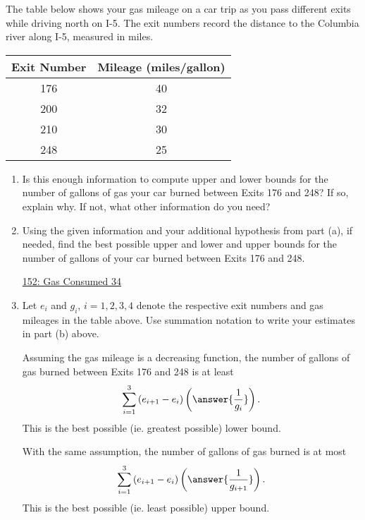 \documentclass{ximera}
\begin{document}
\begin{exercise}  \label{ExY6r3erMMdvb}

The table below shows your gas mileage on a car trip as you pass different exits while driving north on I-5. The exit numbers record the distance to the Columbia river along I-5, measured in miles.


\begin{tabular}{|c|c|}
\hline
Exit Number & Mileage (miles/gallon) \\
\hline
176 & 40 \\  \hline
200 & 32 \\ \hline
210 & 30 \\ \hline
248 & 25 \\
\hline
\end{tabular}

\begin{enumerate}

\item Is this enough information to compute upper and lower bounds for the number of gallons of gas your car burned between Exits 176 and 248? If so, explain why. If not, what other information do you need?

\item Using the given information and your additional hypothesis from part (a), if needed, find the best possible upper and lower and upper bounds for the number of gallons of your car burned between Exits 176 and 248. 

\begin{onlineOnly}
    \begin{center}
\end{center}
\end{onlineOnly}

\href{https://www.desmos.com/calculator/csjpd0u3sw}{152: Gas Consumed 34}




\item Let $e_i$ and $g_i$, $i=1,2,3,4$ denote the respective exit numbers and gas mileages in the table above. Use summation notation to write your estimates in part (b) above.

Assuming the gas mileage is a decreasing function, the number of gallons of gas burned between Exits 176 and 248 is at least
\[
  \sum_{i=1}^3 \left( e_{i+1} - e_{i}  \right)\left( \answer{\frac{1}{g_{i}}}  \right) .
\]
This is the best possible (ie. greatest possible) lower bound. 

With the same assumption, the number of gallons of gas burned is at most
\[
  \sum_{i=1}^3 \left( e_{i+1} - e_{i}  \right)\left( \answer{\frac{1}{g_{i+1}}}  \right) .
\]
This is the best possible (ie. least possible) upper bound.


\end{enumerate}
\end{exercise}
\end{document}
